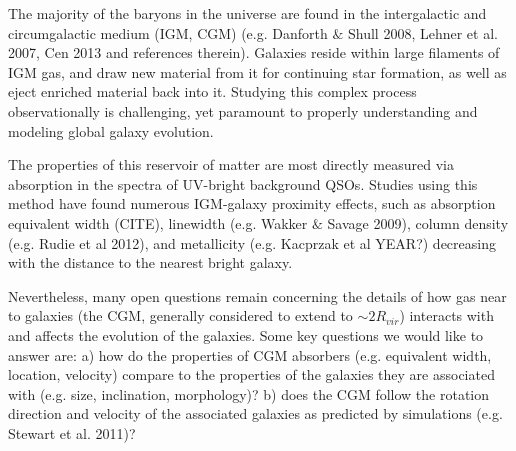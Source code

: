 \documentclass[12pt]{article}
\begin{document}
%
%
\justification          %


\indent \indent The majority of the baryons in the universe are found in the intergalactic and circumgalactic medium (IGM, CGM) (e.g. Danforth $\&$ Shull 2008, Lehner et al. 2007, Cen 2013 and references therein). Galaxies reside within large filaments of IGM gas, and draw new material from it for continuing star formation, as well as eject enriched material back into it. Studying this complex process observationally is challenging, yet paramount to properly understanding and modeling global galaxy evolution.

The properties of this reservoir of matter are most directly measured via absorption in the spectra of UV-bright background QSOs. Studies using this method have found numerous IGM-galaxy proximity effects, such as absorption equivalent width (CITE), linewidth (e.g. Wakker $\&$ Savage 2009), column density (e.g. Rudie et al 2012), and metallicity (e.g. Kacprzak et al YEAR?) decreasing with the distance to the nearest bright galaxy. 

Nevertheless, many open questions remain concerning the details of how gas near to galaxies (the CGM, generally considered to extend to $\sim 2R_{vir}$) interacts with and affects the evolution of the galaxies. Some key questions we would like to answer are:
a) how do the properties of CGM absorbers (e.g. equivalent width, location, velocity) compare to the properties of the galaxies they are associated with (e.g. size, inclination, morphology)?
b) does the CGM follow the rotation direction and velocity of the associated galaxies as predicted by simulations (e.g. Stewart et al. 2011)?
\end{document}
